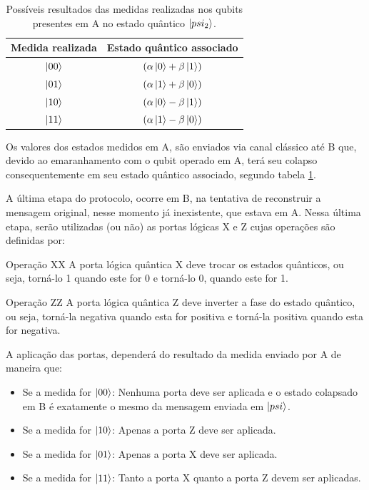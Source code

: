 \begin{table}[ht!]
\centering
\caption{Possíveis resultados das medidas realizadas nos qubits presentes em A no estado quântico $\ket{psi_2}$.}\label{medidas}
\begin{tabular}{cc}
 {Medida realizada} & {Estado quântico associado}\\
 \hline
 $\ket{00}$   & $\left( \alpha \ket{0} + \beta \ket{1} \right)$\\
 $\ket{01}$   & $\left( \alpha \ket{1} + \beta \ket{0} \right)$\\
 $\ket{10}$   & $\left( \alpha \ket{0} - \beta \ket{1} \right)$\\
 $\ket{11}$   & $\left( \alpha \ket{1} - \beta \ket{0} \right)$

  \end{tabular}
\end{table}

Os valores dos estados medidos em A, são enviados via canal clássico até B que, devido ao emaranhamento com o qubit operado em A, terá seu colapso consequentemente em seu estado quântico associado, segundo tabela \ref{medidas}.

A última etapa do protocolo, ocorre em B, na tentativa de reconstruir a mensagem original, nesse momento já inexistente, que estava em A. Nessa última etapa, serão utilizadas (ou não) as portas lógicas X e Z cujas operações são definidas por:

\begin{theo}{Operação X}{X}
A porta lógica quântica X deve trocar os estados quânticos, ou seja, torná-lo 1 quando este for 0 e torná-lo 0, quando este for 1.
\end{theo}

\begin{theo}{Operação Z}{Z}
A porta lógica quântica Z deve inverter a fase do estado quântico, ou seja, torná-la negativa quando esta for positiva e torná-la positiva quando esta for negativa.
\end{theo}

A aplicação das portas, dependerá do resultado da medida enviado por A de maneira que:

\begin{itemize}
\item Se a medida for $\ket{00}$: Nenhuma porta deve ser aplicada e o estado colapsado em B é exatamente o mesmo da mensagem enviada em $\ket{psi}$.
\item Se a medida for $\ket{10}$: Apenas a porta Z deve ser aplicada.
\item Se a medida for $\ket{01}$: Apenas a porta X deve ser aplicada.
\item Se a medida for $\ket{11}$: Tanto a porta X quanto a porta Z devem ser aplicadas.
\end{itemize}

